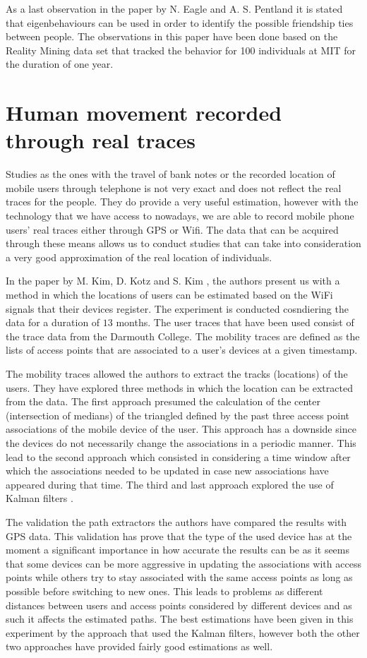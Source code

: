 As a last observation in the paper by N. Eagle and A. S. Pentland it is stated
that eigenbehaviours can be used in order to identify the possible friendship
ties between people. The observations in this paper have been done based on the
Reality Mining data set that tracked the behavior for 100 individuals at MIT for
the duration of one year.

\section{Human movement recorded through real traces}
Studies as the ones with the travel of bank notes or the recorded location of
mobile users through telephone is not very exact and does not reflect the real
traces for the people. They do provide a very useful estimation, however with
the technology that we have access to nowadays, we are able to record mobile
phone users' real traces either through GPS or Wifi. The data that can be
acquired through these means allows us to conduct studies that can take into
consideration a very good approximation of the real location of individuals.

In the paper by M. Kim, D. Kotz and S. Kim \cite{Kim06}, the authors present us
with a method in which the locations of users can be estimated based on the WiFi
signals that their devices register. The experiment is conducted cosndiering the
data for a duration of $13$ months. The user traces that have been used consist
of the trace data from the Darmouth College. The mobility traces are defined as
the lists of access points that are associated to a user's devices at a given
timestamp.

The mobility traces allowed the authors to extract the tracks (locations) of the
users. They have explored three methods in which the location can be extracted
from the data. The first approach presumed the calculation of the center
(intersection of medians) of the triangled defined by the past three access
point associations of the mobile device of the user. This approach has a
downside since the devices do not necessarily change the associations in a
periodic manner. This lead to the second approach which consisted in considering
a time window after which the associations needed to be updated in case new
associations have appeared during that time. The third and last approach
explored the use of Kalman filters \cite{KalmanFilter}.

The validation the path extractors the authors have compared the results with
GPS data. This validation has prove that the type of the used device has at
the moment a significant importance in how accurate the results can be as it seems
that some devices can be more aggressive in updating the associations with
access points while others try to stay associated with the same access points as
long as possible before switching to new ones. This leads to problems as
different distances between users and access points considered by different
devices and as such it affects the estimated paths. The best estimations have
been given in this experiment by the approach that used the Kalman filters,
however both the other two approaches have provided fairly good estimations as
well.

